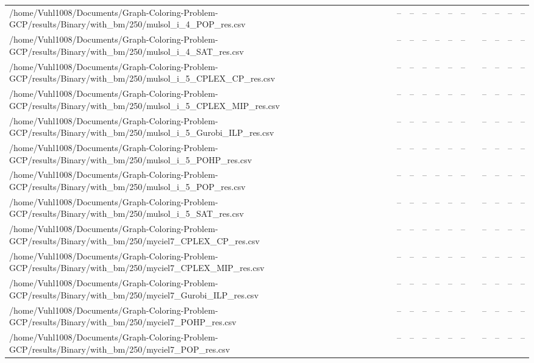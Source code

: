 \begin{table}[htbp]
\begin{tabular}{llllllllllll}
/home/Vuhl1008/Documents/Graph-Coloring-Problem-GCP/results/Binary/with\_bm/250/mulsol\_i\_4\_POP\_res.csv & -- & -- & -- & -- & -- & -- & {} & -- & -- & -- & -- \\
/home/Vuhl1008/Documents/Graph-Coloring-Problem-GCP/results/Binary/with\_bm/250/mulsol\_i\_4\_SAT\_res.csv & -- & -- & -- & -- & -- & -- & {} & -- & -- & -- & -- \\
/home/Vuhl1008/Documents/Graph-Coloring-Problem-GCP/results/Binary/with\_bm/250/mulsol\_i\_5\_CPLEX\_CP\_res.csv & -- & -- & -- & -- & -- & -- & {} & -- & -- & -- & -- \\
/home/Vuhl1008/Documents/Graph-Coloring-Problem-GCP/results/Binary/with\_bm/250/mulsol\_i\_5\_CPLEX\_MIP\_res.csv & -- & -- & -- & -- & -- & -- & {} & -- & -- & -- & -- \\
/home/Vuhl1008/Documents/Graph-Coloring-Problem-GCP/results/Binary/with\_bm/250/mulsol\_i\_5\_Gurobi\_ILP\_res.csv & -- & -- & -- & -- & -- & -- & {} & -- & -- & -- & -- \\
/home/Vuhl1008/Documents/Graph-Coloring-Problem-GCP/results/Binary/with\_bm/250/mulsol\_i\_5\_POHP\_res.csv & -- & -- & -- & -- & -- & -- & {} & -- & -- & -- & -- \\
/home/Vuhl1008/Documents/Graph-Coloring-Problem-GCP/results/Binary/with\_bm/250/mulsol\_i\_5\_POP\_res.csv & -- & -- & -- & -- & -- & -- & {} & -- & -- & -- & -- \\
/home/Vuhl1008/Documents/Graph-Coloring-Problem-GCP/results/Binary/with\_bm/250/mulsol\_i\_5\_SAT\_res.csv & -- & -- & -- & -- & -- & -- & {} & -- & -- & -- & -- \\
/home/Vuhl1008/Documents/Graph-Coloring-Problem-GCP/results/Binary/with\_bm/250/myciel7\_CPLEX\_CP\_res.csv & -- & -- & -- & -- & -- & -- & {} & -- & -- & -- & -- \\
/home/Vuhl1008/Documents/Graph-Coloring-Problem-GCP/results/Binary/with\_bm/250/myciel7\_CPLEX\_MIP\_res.csv & -- & -- & -- & -- & -- & -- & {} & -- & -- & -- & -- \\
/home/Vuhl1008/Documents/Graph-Coloring-Problem-GCP/results/Binary/with\_bm/250/myciel7\_Gurobi\_ILP\_res.csv & -- & -- & -- & -- & -- & -- & {} & -- & -- & -- & -- \\
/home/Vuhl1008/Documents/Graph-Coloring-Problem-GCP/results/Binary/with\_bm/250/myciel7\_POHP\_res.csv & -- & -- & -- & -- & -- & -- & {} & -- & -- & -- & -- \\
/home/Vuhl1008/Documents/Graph-Coloring-Problem-GCP/results/Binary/with\_bm/250/myciel7\_POP\_res.csv & -- & -- & -- & -- & -- & -- & {} & -- & -- & -- & -- \\

\end{tabular}
\end{table}
